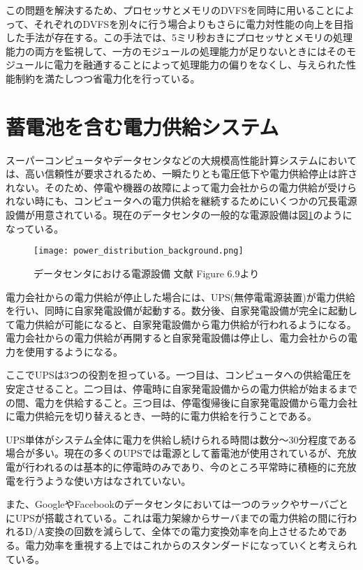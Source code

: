この問題を解決するため、プロセッサとメモリのDVFSを同時に用いることによって、それぞれのDVFSを別々に行う場合よりもさらに電力対性能の向上を目指した手法が存在する\cite{6493615}。この手法では、5ミリ秒おきにプロセッサとメモリの処理能力の両方を監視して、一方のモジュールの処理能力が足りないときにはそのモジュールに電力を融通することによって処理能力の偏りをなくし、与えられた性能制約を満たしつつ省電力化を行っている。



\section{蓄電池を含む電力供給システム}
\label{sec:ups}

スーパーコンピュータやデータセンタなどの大規模高性能計算システムにおいては、高い信頼性が要求されるため、一瞬たりとも電圧低下や電力供給停止は許されない。そのため、停電や機器の故障によって電力会社からの電力供給が受けられない時にも、コンピュータへの電力供給を継続するためにいくつかの冗長電源設備が用意されている。現在のデータセンタの一般的な電源設備は図\ref{fig:power_distribution_background}のようになっている。
\begin{figure}[t]
 \begin{center}
  \texttt{[image: power\_distribution\_background.png]}
 \end{center}
 \caption{データセンタにおける電源設備 文献\cite{Hennessy:2011:CAF:1999263} Figure 6.9より}
 \label{fig:power_distribution_background}
\end{figure}

電力会社からの電力供給が停止した場合には、UPS(無停電電源装置)が電力供給を行い、同時に自家発電設備が起動する。数分後、自家発電設備が完全に起動して電力供給が可能になると、自家発電設備から電力供給が行われるようになる。電力会社からの電力供給が再開すると自家発電設備は停止し、電力会社からの電力を使用するようになる。

ここでUPSは3つの役割を担っている。一つ目は、コンピュータへの供給電圧を安定させること。二つ目は、停電時に自家発電設備からの電力供給が始まるまでの間、電力を供給すること。三つ目は、停電復帰後に自家発電設備から電力会社に電力供給元を切り替えるとき、一時的に電力供給を行うことである。

UPS単体がシステム全体に電力を供給し続けられる時間は数分〜30分程度である場合が多い。現在の多くのUPSでは電源として蓄電池が使用されているが、充放電が行われるのは基本的に停電時のみであり、今のところ平常時に積極的に充放電を行うような使い方はなされていない。

また、GoogleやFacebookのデータセンタにおいては一つのラックやサーバごとにUPSが搭載されている\cite{Datacenter}。これは電力架線からサーバまでの電力供給の間に行われるD/A変換の回数を減らして、全体での電力変換効率を向上させるためである。電力効率を重視する上ではこれからのスタンダードになっていくと考えられている。


